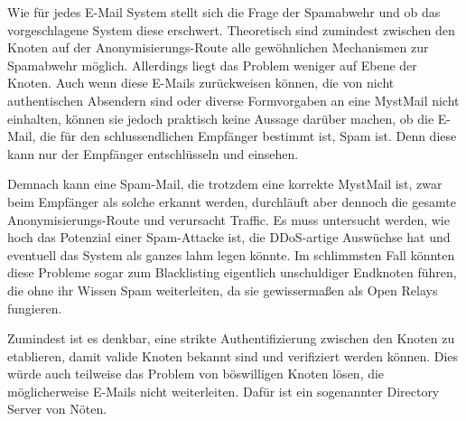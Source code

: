 Wie für jedes E-Mail System stellt sich die Frage der Spamabwehr und ob das vorgeschlagene System diese erschwert. Theoretisch sind zumindest zwischen den Knoten auf der Anonymisierungs-Route alle gewöhnlichen Mechanismen zur Spamabwehr möglich. Allerdings liegt das Problem weniger auf Ebene der Knoten. Auch wenn diese E-Mails zurückweisen können, die von nicht authentischen Absendern sind oder diverse Formvorgaben an eine MystMail nicht einhalten, können sie jedoch praktisch keine Aussage darüber machen, ob die E-Mail, die für den schlussendlichen Empfänger bestimmt ist, Spam ist. Denn diese kann nur der Empfänger entschlüsseln und einsehen.

Demnach kann eine Spam-Mail, die trotzdem eine korrekte MystMail ist, zwar beim Empfänger als solche erkannt werden, durchläuft aber dennoch die gesamte Anonymisierungs-Route und verursacht Traffic. Es muss untersucht werden, wie hoch das Potenzial einer Spam-Attacke ist, die DDoS-artige Auswüchse hat und eventuell das System als ganzes lahm legen könnte.
Im schlimmsten Fall könnten diese Probleme sogar zum Blacklisting eigentlich unschuldiger Endknoten führen, die ohne ihr Wissen Spam weiterleiten, da sie gewissermaßen als Open Relays fungieren.

Zumindest ist es denkbar, eine strikte Authentifizierung zwischen den Knoten zu etablieren, damit valide Knoten bekannt sind und verifiziert werden können. Dies würde auch teilweise das Problem von böswilligen Knoten lösen, die möglicherweise E-Mails nicht weiterleiten. Dafür ist ein sogenannter Directory Server von Nöten.

